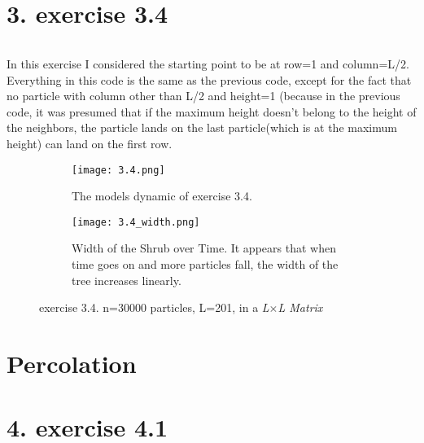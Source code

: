 \documentclass[12pt]{article}
\begin{document}
\part*{3. exercise 3.4}
\paragraph*{} In this exercise I considered the starting point to be at row=1 and column=L/2. Everything in this code is the same as the previous code, except for the fact that no particle with column other than L/2 and height=1 (because in the previous code, it was presumed that if the maximum height doesn't belong to the height of the neighbors, the particle lands on the last particle(which is at the maximum height) can land on the first row.
\begin{figure}[H]
	\centering
	\begin{subfigure}[t]{0.7\textwidth}
		\texttt{[image: 3.4.png]}
		\label{fig:mesh3.1}
		\caption{The models dynamic of exercise 3.4.}
	\end{subfigure}\hfill
	\begin{subfigure}[t]{0.7\textwidth}
		\texttt{[image: 3.4\_width.png]}
		\label{fig:mesh3.2}
		\caption{Width of the Shrub over Time. It appears that when time goes on and more particles fall, the width of the tree increases linearly. }
	\end{subfigure}
	\label{fig:mesh3}
	\caption{exercise 3.4. n=30000 particles, L=201, in a \textit{L$\times$L Matrix}}
\end{figure}
\pagebreak
\part*{Percolation }
\part*{4. exercise 4.1}
\end{document}
